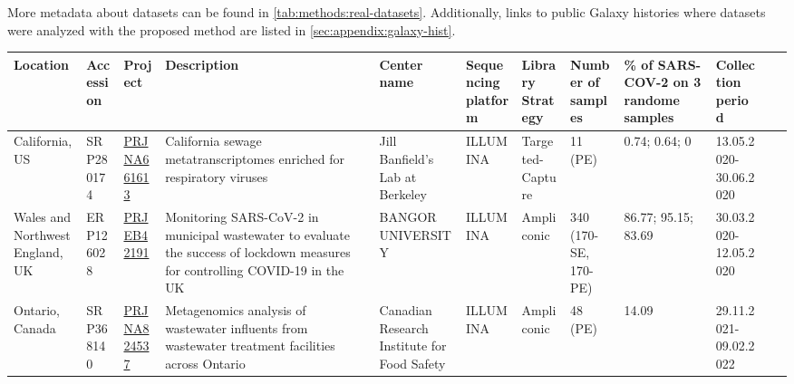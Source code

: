             More metadata about datasets can be found in \cref{tab:methods:real-datasets}. Additionally, links to public Galaxy histories where datasets were analyzed with the proposed method are listed in \cref{sec:appendix:galaxy-hist}.
            \begin{landscape}
            \centering\vspace*{\fill}
                \begin{table}[ht!]
                \tiny
                \begin{tabular}{l|l|l|l|l|l|l|l|l|l|l|l}
                    \textbf{Location}&\textbf{Accession}&\textbf{Project}&\textbf{Description}&\textbf{Center name}&\multicolumn{1}{m{2cm}|}{\textbf{Sequencing platform}}&\multicolumn{1}{m{2cm}|}{\textbf{Library Strategy}}&\multicolumn{1}{m{2cm}|}{\textbf{Number of samples}}&\multicolumn{1}{m{2cm}|}{\textbf{\% of SARS-COV-2 on 3 randome samples}}&\multicolumn{1}{m{2cm}}{\textbf{Collection period}} \\
                    \hline 
                    \multicolumn{1}{m{1.5cm}|}{California, US}&SRP280174&\href{https://www.ebi.ac.uk/ena/browser/view/PRJNA661613}{PRJNA661613}&\multicolumn{1}{m{2cm}|}{California sewage metatranscriptomes enriched for respiratory viruses}&\multicolumn{1}{m{2cm}|}{Jill Banfield's Lab at Berkeley}&ILLUMINA&\multicolumn{1}{m{2cm}|}{Targeted-Capture}&11 (PE)&\multicolumn{1}{m{2cm}|}{0.74; 0.64; 0}&\multicolumn{1}{m{2cm}}{13.05.2020-30.06.2020} \\ \hline
                    \multicolumn{1}{m{1.5cm}|}{Wales and Northwest England, UK}&ERP126028&\href{https://www.ebi.ac.uk/ena/browser/view/PRJEB42191}{PRJEB42191}&\multicolumn{1}{m{2cm}|}{Monitoring SARS-CoV-2 in municipal wastewater to evaluate the success of lockdown measures for controlling COVID-19 in the UK}&\multicolumn{1}{m{2cm}|}{BANGOR UNIVERSITY}&ILLUMINA&\multicolumn{1}{m{2cm}|}{Ampliconic}&\multicolumn{1}{m{2cm}|}{340 (170-SE, 170-PE)}&\multicolumn{1}{m{2cm}|}{86.77; 95.15; 83.69}&\multicolumn{1}{m{2cm}}{30.03.2020-12.05.2020} \\\hline
                    \multicolumn{1}{m{1.5cm}|}{Ontario, Canada}&SRP368140&\href{https://www.ebi.ac.uk/ena/browser/view/PRJNA824537?show=reads}{PRJNA824537}&\multicolumn{1}{m{2cm}|}{Metagenomics analysis of wastewater influents from wastewater treatment facilities across Ontario}&\multicolumn{1}{m{2cm}|}{Canadian Research Institute for Food Safety}&ILLUMINA&\multicolumn{1}{m{2cm}|}{Ampliconic}&48 (PE)&\multicolumn{1}{m{2cm}|}{14.09}&\multicolumn{1}{m{2cm}}{29.11.2021-09.02.2022} \\\hline

\end{tabular}
\end{table}
\end{landscape}
